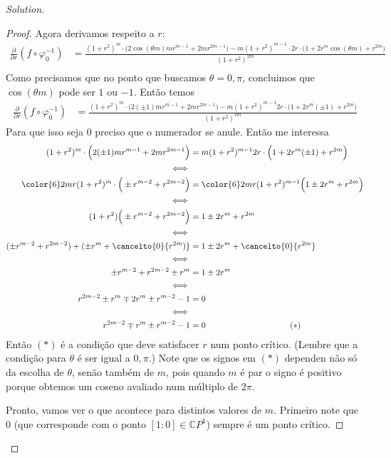 \begin{proof}[Solution]
\begin{proof}
Agora derivamos respeito a \(r\):
\begin{align*}
\frac{\partial }{\partial r}(f \circ \varphi_0^{-1})&=\frac{(1+r^2)^m\cdot \Big(2\cos (\theta m)m r^{m-1}+2mr^{2m-1}\Big)-m(1+r^2)^{m-1}\cdot 2r\cdot \Big(1+2r^m \cos (\theta m)+r^{2m}\Big)}{(1+r^2)^{2m}}\\
\end{align*}
Como precisamos que no ponto que buscamos \(\theta =0,\pi\), concluimos que \(\cos (\theta m)\) pode ser \(1\) ou \(-1\). Então temos
\begin{align*}
\frac{\partial }{\partial r}(f \circ \varphi_0^{-1})&=\frac{(1+r^2)^m\cdot \Big(2(\pm 1)m r^{m-1}+2mr^{2m-1}\Big)-m(1+r^2)^{m-1}2r\cdot \Big(1+2r^m (\pm 1)+r^{2m}\Big)}{(1+r^2)^{2m}}
\end{align*}
Para que isso seja \(0\) preciso que o numerador se anule. Então me interessa
\begin{align*}
(1+r^2)^m\cdot \Big(2(\pm 1)m r^{m-1}+2mr^{2m-1}\Big)&=m(1+r^2)^{m-1}2r\cdot \Big(1+2r^m (\pm 1)+r^{2m}\Big)\\
\iff\\
{\color{6}2mr}(1+r^2)^m\cdot \Big(\pm r^{m-2}+r^{2m-2}\Big)&={\color{6}2mr}(1+r^2)^{m-1}\Big(1\pm 2r^m+r^{2m}\Big)\\
\iff\\
(1+r^2)\Big(\pm r^{m-2}+r^{2m-2}\Big)&=1\pm 2r^m+r^{2m}\\
\iff\\
(\pm r^{m-2}+r^{2m-2})+(\pm r^{m}+\cancelto{0}{r^{2m})}&=1\pm 2r^m+\cancelto{0}{r^{2m}}\\\iff\\
\pm r^{m-2}+r^{2m-2}\pm r^{m}&=1\pm 2r^m\\
\iff \\
r^{2m-2}\pm r^m \mp 2r^m \pm r^{m-2}-1&=0 \\
\iff\\
r^{2m-2}\mp r^m \pm r^{m-2}-1&=0 \qquad \qquad\qquad \qquad \qquad   (*)
\end{align*}
Então \((*)\) é a condição que deve satisfacer \(r\) num ponto crítico. (Lembre que a condição para \(\theta\) é ser igual a \(0,\pi\).) Note que os signos em \((*)\) dependen não só da escolha de \(\theta\), senão também de \(m\), pois quando \(m\) é par o signo é positivo porque obtemos um coseno avaliado num múltiplo de \(2\pi\).

Pronto, vamos ver o que acontece para distintos valores de \(m\). Primeiro note que  \(0\) (que corresponde com o ponto  \([1:0] \in \mathbb{C}P^1\)) sempre é um ponto crítico.


\end{proof}
\end{proof}
